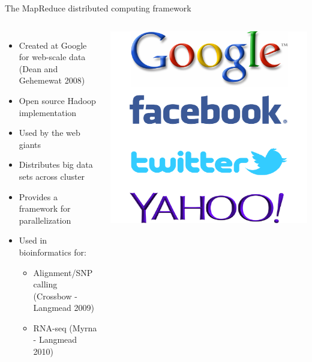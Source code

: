 \documentclass{beamer}
\begin{document}
\begin{frame}{The MapReduce distributed computing framework}
  \begin{columns}
  \begin{itemize}
  \item Created at Google for web-scale data (Dean and
    Gehemewat 2008)
  \item Open source Hadoop implementation
  \item Used by the web giants
  \item Distributes big data sets across cluster
  \item Provides a framework for parallelization
  \item Used in bioinformatics for:
  \begin{itemize}
    \item Alignment/SNP calling (Crossbow - Langmead 2009)
    \item RNA-seq (Myrna - Langmead 2010)
  \end{itemize}
 \end{itemize}
    \includegraphics[width=.7\textwidth]{hadoop_user_logos.pdf}
\end{columns}
\end{frame}
\end{document}
